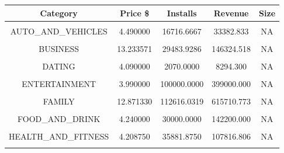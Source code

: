 \documentclass[11pt,preprint, authoryear]{elsarticle}
\let\origtable\table
\let\endorigtable\endtable
\renewenvironment{table}[1][2] {
    \expandafter\origtable\expandafter[H]
} {
    \endorigtable
}
\numberwithin{equation}{section}
\numberwithin{figure}{section}
\numberwithin{table}{section}
\begin{document}
\begin{table}

\caption{\label{tab:unnamed-chunk-2}Summary of Application Statistics per Catergory}
\centering
\begin{tabular}[t]{c|c|c|c|c}
\hline
Category & Price \$ & Installs & Revenue & Size\\
\hline
\cellcolor{gray!6}{ART\_AND\_DESIGN} & \cellcolor{gray!6}{1.990000} & \cellcolor{gray!6}{5333.3333} & \cellcolor{gray!6}{10613.333} & \cellcolor{gray!6}{5.200000}\\
\hline
AUTO\_AND\_VEHICLES & 4.490000 & 16716.6667 & 33382.833 & NA\\
\hline
\cellcolor{gray!6}{BOOKS\_AND\_REFERENCE} & \cellcolor{gray!6}{4.277500} & \cellcolor{gray!6}{832.7143} & \cellcolor{gray!6}{3222.384} & \cellcolor{gray!6}{NA}\\
\hline
BUSINESS & 13.233571 & 29483.9286 & 146324.518 & NA\\
\hline
\cellcolor{gray!6}{COMMUNICATION} & \cellcolor{gray!6}{3.079259} & \cellcolor{gray!6}{50372.2222} & \cellcolor{gray!6}{157309.796} & \cellcolor{gray!6}{NA}\\
\hline
DATING & 4.090000 & 2070.0000 & 8294.300 & NA\\
\hline
\cellcolor{gray!6}{EDUCATION} & \cellcolor{gray!6}{4.656667} & \cellcolor{gray!6}{34000.0000} & \cellcolor{gray!6}{136326.667} & \cellcolor{gray!6}{43.666667}\\
\hline
ENTERTAINMENT & 3.990000 & 100000.0000 & 399000.000 & NA\\
\hline
\cellcolor{gray!6}{EVENTS} & \cellcolor{gray!6}{109.990000} & \cellcolor{gray!6}{1.0000} & \cellcolor{gray!6}{109.990} & \cellcolor{gray!6}{6.700000}\\
\hline
FAMILY & 12.871330 & 112616.0319 & 615710.773 & NA\\
\hline
\cellcolor{gray!6}{FINANCE} & \cellcolor{gray!6}{170.637059} & \cellcolor{gray!6}{10917.7647} & \cellcolor{gray!6}{1513334.058} & \cellcolor{gray!6}{NA}\\
\hline
FOOD\_AND\_DRINK & 4.240000 & 30000.0000 & 142200.000 & NA\\
\hline
\cellcolor{gray!6}{GAME} & \cellcolor{gray!6}{3.467195} & \cellcolor{gray!6}{256097.1341} & \cellcolor{gray!6}{496202.888} & \cellcolor{gray!6}{NA}\\
\hline
HEALTH\_AND\_FITNESS & 4.208750 & 35881.8750 & 107816.806 & NA\\
\hline
\cellcolor{gray!6}{LIBRARIES\_AND\_DEMO} & \cellcolor{gray!6}{0.990000} & \cellcolor{gray!6}{100.0000} & \cellcolor{gray!6}{99.000} & \cellcolor{gray!6}{4.700000}\\

\end{tabular}
\end{table}
\end{document}

